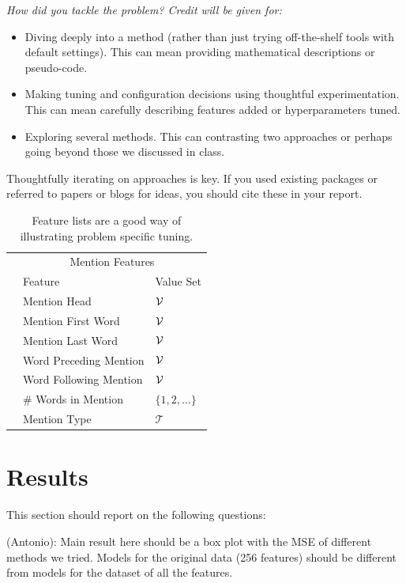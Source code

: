\documentclass[11pt]{article}
\begin{document}
{\itshape
How did you tackle the problem? Credit will be given for:

  \begin{itemize}
  \item Diving deeply into 	a method (rather than just trying
    off-the-shelf tools with default settings). This can mean 
    providing mathematical descriptions or pseudo-code.
  \item Making tuning and configuration decisions using thoughtful experimentation.  
    This can mean carefully describing features added or hyperparameters tuned.
  \item Exploring several methods. This can contrasting two approaches
    or perhaps going beyond those we discussed in class.
  \end{itemize}

  \noindent Thoughtfully iterating on approaches is key.
  If you used existing packages or referred to papers or blogs for ideas,
  you should cite these in your report. 

  \begin{table}
    \centering
    \begin{tabular}{@{}lll@{}}
      &\multicolumn{2}{c}{Mention Features  } \\
      & Feature & Value Set\\
      \midrule
      & Mention Head & $\mathcal{V}$ \\
      & Mention First Word & $\mathcal{V}$ \\
      & Mention Last Word & $\mathcal{V}$ \\
      & Word Preceding Mention & $\mathcal{V}$ \\
      & Word Following Mention & $\mathcal{V}$\\
      & \# Words in Mention & $\{1, 2, \ldots \}$ \\
      & Mention Type & $\mathcal{T}$ \\
      \bottomrule
      
    \end{tabular}
    \caption{Feature lists are a good way of illustrating problem specific tuning.}
  \end{table}

}

\section{Results}
This section should report on the following questions: 

(Antonio): Main result here should be a box plot with the MSE of different methods we tried. Models for the original data (256 features) should be different from models for the dataset of all the features.
\end{document}
